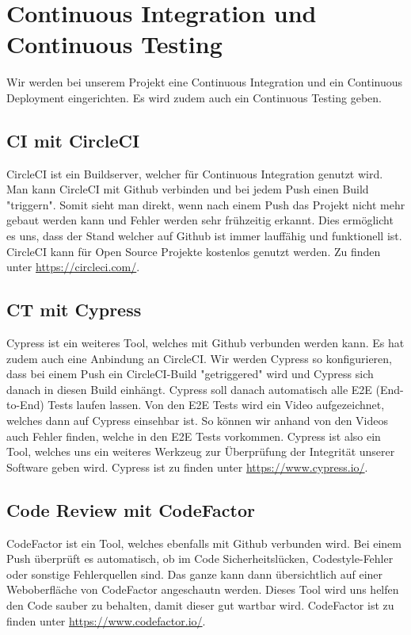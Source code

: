 	\section{Continuous Integration und Continuous Testing}
	Wir werden bei unserem Projekt eine Continuous Integration und ein Continuous Deployment eingerichten. Es wird zudem auch ein Continuous Testing geben.

	\subsection{CI mit CircleCI}
	CircleCI ist ein Buildserver, welcher für Continuous Integration genutzt wird. Man kann CircleCI mit Github verbinden und bei jedem Push einen Build "triggern". Somit sieht man direkt, wenn nach einem Push das Projekt nicht mehr gebaut werden kann und Fehler werden sehr frühzeitig erkannt. Dies ermöglicht es uns, dass der Stand welcher auf Github ist immer lauffähig und funktionell ist. CircleCI kann für Open Source Projekte kostenlos genutzt werden. Zu finden unter \href{https://circleci.com/}{https://circleci.com/}.

	\newpage

	\subsection{CT mit Cypress}
	Cypress ist ein weiteres Tool, welches mit Github verbunden werden kann. Es hat zudem auch eine Anbindung an CircleCI. Wir werden Cypress so konfigurieren, dass bei einem Push ein CircleCI-Build "getriggered" wird und Cypress sich danach in diesen Build einhängt. Cypress soll danach automatisch alle E2E (End-to-End) Tests laufen lassen. Von den E2E Tests wird ein Video aufgezeichnet, welches dann auf Cypress einsehbar ist. So können wir anhand von den Videos auch Fehler finden, welche in den E2E Tests vorkommen. Cypress ist also ein Tool, welches uns ein weiteres Werkzeug zur Überprüfung der Integrität unserer Software geben wird. Cypress ist zu finden unter \href{https://www.cypress.io/}{https://www.cypress.io/}.

	\subsection{Code Review mit CodeFactor}
	CodeFactor ist ein Tool, welches ebenfalls mit Github verbunden wird. Bei einem Push überprüft es automatisch, ob im Code Sicherheitslücken, Codestyle-Fehler oder sonstige Fehlerquellen sind. Das ganze kann dann übersichtlich auf einer Weboberfläche von CodeFactor angeschautn werden. Dieses Tool wird uns helfen den Code sauber zu behalten, damit dieser gut wartbar wird. CodeFactor ist zu finden unter \href{https://www.codefactor.io/}{https://www.codefactor.io/}.

